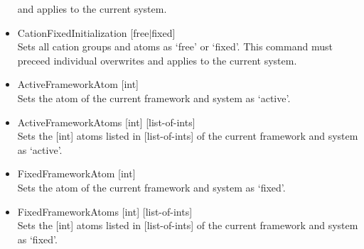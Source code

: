\begin{itemize}
and applies to the current system.
\item{CationFixedInitialization [free$|$fixed]}\\
Sets all cation groups and atoms as `free' or `fixed'. This command must preceed individual overwrites
and applies to the current system.
\item{ActiveFrameworkAtom [int]}\\
Sets the atom of the current framework and system as `active'.
\item{ActiveFrameworkAtoms [int] [list-of-ints]}\\
Sets the [int] atoms listed in [list-of-ints] of the current framework and system as `active'.
\item{FixedFrameworkAtom [int]}\\
Sets the atom of the current framework and system as `fixed'.
\item{FixedFrameworkAtoms [int] [list-of-ints]}\\
Sets the [int] atoms listed in [list-of-ints] of the current framework and system as `fixed'.


\end{itemize}

